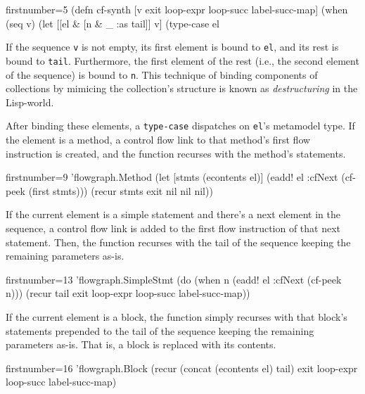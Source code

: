 \documentclass[11pt]{article}
\begin{document}
\begin{clojurecode*}{firstnumber=5}
(defn cf-synth [v exit loop-expr loop-succ label-succ-map]
  (when (seq v)
    (let [[el & [n & _ :as tail]] v]
      (type-case el
\end{clojurecode*}

If the sequence \verb|v| is not empty, its first element is bound to \verb|el|,
and its rest is bound to \verb|tail|.  Furthermore, the first element of the
rest (i.e., the second element of the sequence) is bound to \verb|n|.  This
technique of binding components of collections by mimicing the collection's
structure is known as \emph{destructuring} in the Lisp-world.

After binding these elements, a \verb|type-case| dispatches on \verb|el|'s
metamodel type.  If the element is a method, a control flow link to that
method's first flow instruction is created, and the function recurses with the
method's statements.

\begin{clojurecode*}{firstnumber=9}
        'flowgraph.Method
                   (let [stmts (econtents el)]
                     (eadd! el :cfNext (cf-peek (first stmts)))
                     (recur stmts exit nil nil nil))
\end{clojurecode*}

If the current element is a simple statement and there's a next element in the
sequence, a control flow link is added to the first flow instruction of that
next statement.  Then, the function recurses with the tail of the sequence
keeping the remaining parameters as-is.

\begin{clojurecode*}{firstnumber=13}
        'flowgraph.SimpleStmt
                   (do (when n (eadd! el :cfNext (cf-peek n)))
                       (recur tail exit loop-expr loop-succ label-succ-map))
\end{clojurecode*}

If the current element is a block, the function simply recurses with that
block's statements prepended to the tail of the sequence keeping the remaining
parameters as-is.  That is, a block is replaced with its contents.

\begin{clojurecode*}{firstnumber=16}
        'flowgraph.Block
                   (recur (concat (econtents el) tail)
                          exit loop-expr loop-succ label-succ-map)
\end{clojurecode*}
\end{document}
